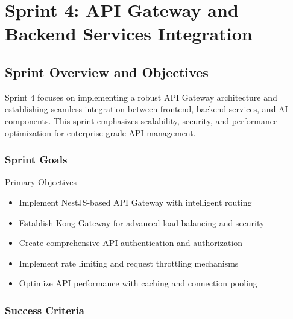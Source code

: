 \chapter{Sprint 4: API Gateway and Backend Services Integration}

\section{Sprint Overview and Objectives}

Sprint 4 focuses on implementing a robust API Gateway architecture and establishing seamless integration between frontend, backend services, and AI components. This sprint emphasizes scalability, security, and performance optimization for enterprise-grade API management.

\subsection{Sprint Goals}

\begin{sprintbox}{Primary Objectives}
\begin{itemize}
    \item Implement NestJS-based API Gateway with intelligent routing
    \item Establish Kong Gateway for advanced load balancing and security
    \item Create comprehensive API authentication and authorization
    \item Implement rate limiting and request throttling mechanisms
    \item Optimize API performance with caching and connection pooling
\end{itemize}
\end{sprintbox}

\subsection{Success Criteria}

